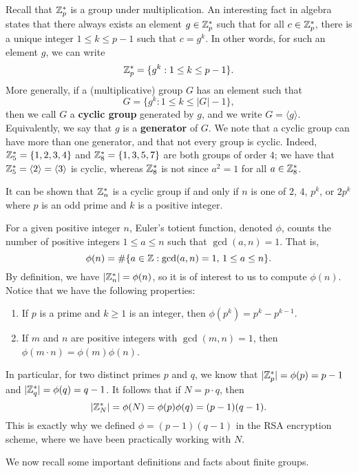 Recall that $\mathbb{Z}_p^*$ is a group under multiplication. An interesting fact in algebra states that 
there always exists an element $g \in \mathbb{Z}_p^*$ such that for all $c \in \mathbb{Z}_p^*$, there is a unique 
integer $1 \leq k \leq p-1$ such that $c = g^k$. In other words, for such an element $g$, we can write 
\[ \mathbb{Z}_p^* = \{g^k : 1 \leq k \leq p-1\}. \]
More generally, if a (multiplicative) group $G$ has an element such that 
\[ G = \{g^k : 1 \leq k \leq |G|-1\}, \]
then we call $G$ a {\bf cyclic group} generated by $g$, and we write $G = \langle g \rangle$. 
Equivalently, we say that $g$ is a {\bf generator} of $G$. We note that a cyclic group can 
have more than one generator, and that not every group is cyclic. Indeed, $\mathbb{Z}_5^* = \{1, 2, 3, 4\}$ 
and $\mathbb{Z}_8^* = \{1, 3, 5, 7\}$ are both groups of order $4$; we have that $\mathbb{Z}_5^* = \langle 2 
\rangle = \langle 3 \rangle$ is cyclic, whereas $\mathbb{Z}_8^*$ is not since $a^2 = 1$ for all $a \in \mathbb{Z}_8^*$. 

It can be shown that $\mathbb{Z}_n^*$ is a cyclic group if and only if $n$ is one of $2$, $4$, $p^k$, or 
$2p^k$ where $p$ is an odd prime and $k$ is a positive integer. 

For a given positive integer $n$, Euler's totient function, denoted $\phi$, counts the number of positive
integers $1 \leq a \leq n$ such that $\gcd(a, n) = 1$. That is, 
\[ \phi(n) = \#\{a \in \mathbb{Z} : \gcd(a, n) = 1,\, 1 \leq a \leq n\}. \]
By definition, we have $|\mathbb{Z}_n^*| = \phi(n)$, so it is of interest to us to compute $\phi(n)$. 
Notice that we have the following properties:
\begin{enumerate}[(1)]
    \item If $p$ is a prime and $k \geq 1$ is an integer, then $\phi(p^k) = p^k - p^{k-1}$. 
    \item If $m$ and $n$ are positive integers with $\gcd(m, n) = 1$, then 
    $\phi(m \cdot n) = \phi(m) \phi(n)$. 
\end{enumerate}
In particular, for two distinct primes $p$ and $q$, we know that $|\mathbb{Z}_p^*| = \phi(p) = p-1$ 
and $|\mathbb{Z}_q^*| = \phi(q) = q-1$. It follows that if $N = p \cdot q$, then 
\[ |\mathbb{Z}_N^*| = \phi(N) = \phi(p)\phi(q) = (p-1)(q-1). \]
This is exactly why we defined $\phi = (p-1)(q-1)$ in the RSA encryption scheme, where we have been 
practically working with $N$. 

We now recall some important definitions and facts about finite groups. 

